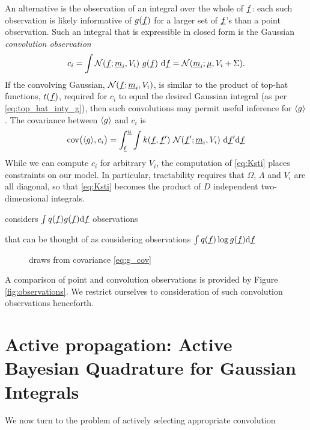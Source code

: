 \documentclass[twoside]{article}
\begin{document}

An alternative is the observation of an integral over the whole of $\underline{\smash{f}}$: each such observation is likely informative of $g(\underline{\smash{f}})$ for a larger set of $\underline{\smash{f}}$'s than a point observation.
Such an integral that is expressible in closed form is the Gaussian \emph{convolution observation}
 \begin{equation}\label{eq:conv}
 c_i = \int \mathcal{N}(\underline{\smash{f}};\underline{\smash{m}}_i,V_i)~g(\underline{\smash{f}})~\mathrm{d} \underline{\smash{f}} = \mathcal{N}(\underline{\smash{m}}_i;\underline{\smash{\mu}},V_i+\Sigma).
\end{equation}
 If the convolving Gaussian, $\mathcal{N}(\underline{\smash{f}};\underline{\smash{m}}_i,V_i)$, is similar to the product of top-hat functions, $t(\underline{\smash{f}})$, required for $c_i$ to equal the desired Gaussian integral (as per \eqref{eq:top_hat_inty_g}), then such convolutions may permit useful inference for $\langle g \rangle$. The covariance between $\langle g \rangle$ and $c_i$ is
\begin{align}\label{eq:Ksti}
\text{cov}\bigl(\langle g \rangle, c_i\bigr) =
\int_{\underline{\smash{\ell}}}^{\underline{\smash{u}}} \int  k(\underline{\smash{f}}, \underline{\smash{f}}')~\mathcal{N}(\underline{\smash{f}}';\underline{\smash{m}}_i,V_i)~\mathrm{d} \underline{\smash{f}}' \mathrm{d} \underline{\smash{f}} 
\end{align}
While we can compute $c_i$ for arbitrary $V_i$, the computation of \eqref{eq:Ksti} places constraints on our model. In particular, tractability requires that $\Omega$, $\Lambda$ and $V_i$ are all diagonal, so that \eqref{eq:Ksti} becomes the product of $D$ independent two-dimensional integrals.


\ep considers $\int q(\underline{\smash{f}}) g(\underline{\smash{f}}) \mathrm{d}\underline{\smash{f}}$ observations

that \vb can be thought of as considering observations $\int q(\underline{\smash{f}}) \log g(\underline{\smash{f}}) \mathrm{d}\underline{\smash{f}}$


\begin{figure}
 \caption{draws from covariance \eqref{eq:g_cov}}
\end{figure}



A comparison of point and convolution observations is provided by Figure \ref{fig:observations}. 
We restrict ourselves to consideration of such convolution observations henceforth.


\section{Active propagation: Active Bayesian Quadrature for Gaussian Integrals}
\label{sec:active}

We now turn to the problem of actively selecting appropriate convolution 



\end{document}
